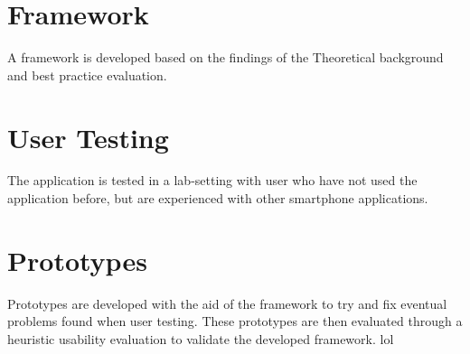 \section{Framework}
A framework is developed based on the findings of the Theoretical background and best practice evaluation.

\section{User Testing}
The application is tested in a lab-setting with user who have not used the application before, but are experienced with other smartphone applications. 

\section{Prototypes}
%
Prototypes are developed with the aid of the framework to try and fix eventual problems found when user testing. These prototypes are then evaluated through a heuristic usability evaluation to validate the developed framework.
lol
